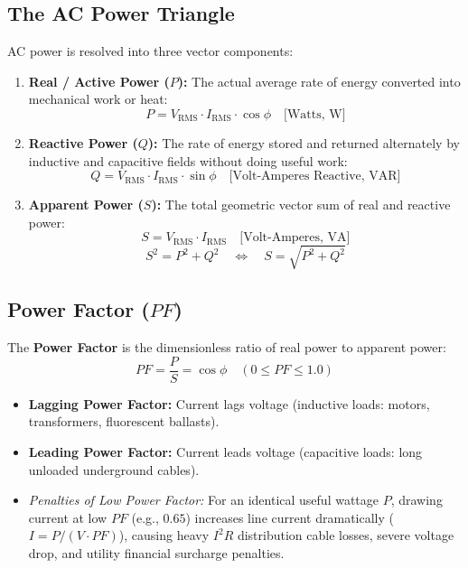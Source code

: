 \subsection{The AC Power Triangle}
AC power is resolved into three vector components:
\begin{enumerate}[label=\bfseries\arabic*.]
    \item \textbf{Real / Active Power ($P$):} The actual average rate of energy converted into mechanical work or heat:
    \begin{equation}
    \label{eq:real_power}
    \boxed{P = V_{\text{RMS}} \cdot I_{\text{RMS}} \cdot \cos\phi \quad \text{[Watts, W]}}
    \end{equation}
    \item \textbf{Reactive Power ($Q$):} The rate of energy stored and returned alternately by inductive and capacitive fields without doing useful work:
    \begin{equation}
    \label{eq:reactive_power}
    \boxed{Q = V_{\text{RMS}} \cdot I_{\text{RMS}} \cdot \sin\phi \quad \text{[Volt-Amperes Reactive, VAR]}}
    \end{equation}
    \item \textbf{Apparent Power ($S$):} The total geometric vector sum of real and reactive power:
    \begin{equation}
    \label{eq:apparent_power}
    \boxed{S = V_{\text{RMS}} \cdot I_{\text{RMS}} \quad \text{[Volt-Amperes, VA]}}
    \end{equation}
    \begin{equation}
    \label{eq:power_triangle_pythagoras}
    \boxed{S^2 = P^2 + Q^2 \quad \Longleftrightarrow \quad S = \sqrt{P^2 + Q^2}}
    \end{equation}
\end{enumerate}

\subsection{Power Factor ($PF$)}
The \textbf{Power Factor} is the dimensionless ratio of real power to apparent power:
\begin{equation}
\label{eq:power_factor_def}
\boxed{PF = \frac{P}{S} = \cos\phi \quad (0 \le PF \le 1.0)}
\end{equation}
\begin{itemize}
    \item \textbf{Lagging Power Factor:} Current lags voltage (inductive loads: motors, transformers, fluorescent ballasts).
    \item \textbf{Leading Power Factor:} Current leads voltage (capacitive loads: long unloaded underground cables).
    \item \textit{Penalties of Low Power Factor:} For an identical useful wattage $P$, drawing current at low $PF$ (e.g., $0.65$) increases line current dramatically ($I = P / (V \cdot PF)$), causing heavy $I^2R$ distribution cable losses, severe voltage drop, and utility financial surcharge penalties.
\end{itemize}

